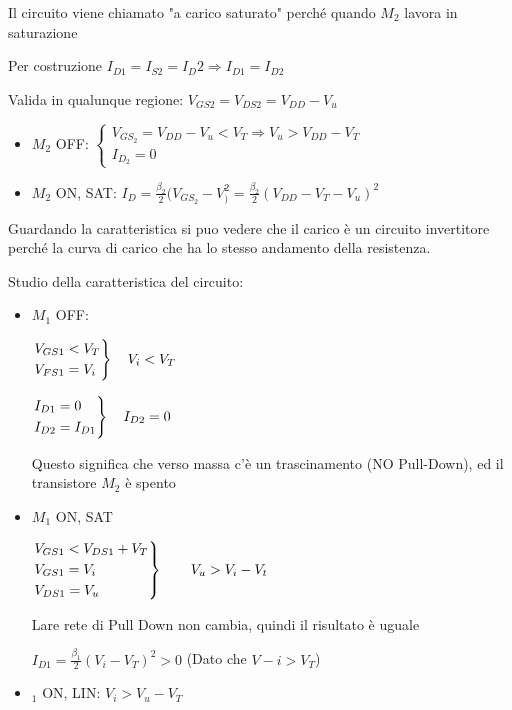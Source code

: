 \documentclass{article}
\begin{document}
Il circuito viene chiamato "a carico saturato" perché quando $M_2$ lavora in saturazione

Per costruzione $I_{D1} = I_{S2} = I_D2 \Rightarrow I_{D1} = I_{D2}$

Valida in qualunque regione: $V_{GS2} = V_{DS2} = V_{DD} - V_u$

\begin{itemize}
    \item $M_2$ OFF:
       $
       \begin{cases}
           V_{GS_2} = V_{DD} - V_u < V_T \Rightarrow V_u > V_{DD} - V_T\\
           I_{D_2} = 0
       \end{cases}
       $
   \item $M_2$ ON, SAT:
       $I_D = \frac{\beta_2}{2} (V_{GS_2} - V_)^2 = \frac{\beta_2}{2} (V_{DD} - V_T - V_u)^2$
\end{itemize}

Guardando la caratteristica si puo vedere che il carico è un circuito invertitore perché la curva di carico che ha lo stesso andamento della resistenza.

Studio della caratteristica del circuito:
\begin{itemize}
    \item $M_1$ OFF:

        $\begin{rcases}
            V_{GS1} < V_T\\
            V_{FS1} = V_i
        \end{rcases} \quad V_i < V_T$

        $\begin{rcases}
            I_{D1} = 0\\
            I_{D2} = I_{D1}
        \end{rcases} \quad I_{D2} = 0$

        Questo significa che verso massa c'è un trascinamento (NO Pull-Down),
        ed il transistore $M_2$ è spento

    \item $M_1$ ON, SAT

        $\begin{rcases}
            V_{GS1} < V_{DS1} + V_T\\
            V_{GS1} = V_i\\
            V_{DS1} = V_u
        \end{rcases} \qquad V_u > V_i - V_t$

        Lare rete  di Pull Down non cambia, quindi il risultato è uguale

        $I_{D1} = \frac{\beta_1}{2}(V_i - V_T)^2 > 0$  (Dato che $V-i > V_T$)
    \item $_1$ ON, LIN:  $V_i > V_u - V_T$
\end{itemize}
\end{document}

